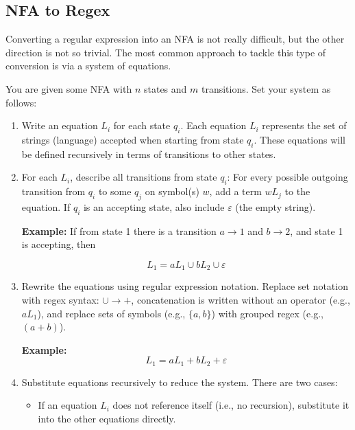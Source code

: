 \subsection{NFA to Regex}

Converting a regular expression into an NFA is not really difficult, but the other direction is not 
so trivial. The most common approach to tackle this type of conversion is via a system of equations.

You are given some NFA with \(n\) states and \(m\) transitions. Set your system as follows:

\begin{enumerate}

    \item Write an equation \(L_i\) for each state \(q_i\). 
    Each equation \(L_i\) represents the set of strings (language) accepted when starting from state 
    \(q_i\). These equations will be defined recursively in terms of transitions to other states.

    \item For each \(L_i\), describe all transitions from state \(q_i\):  
    For every possible outgoing transition from \(q_i\) to some \(q_j\) on symbol(s) \(w\), add a term 
    \(w L_j\) to the equation. If \(q_i\) is an accepting state, also include \(\varepsilon\) (the empty 
    string).

    \textbf{Example:} If from state 1 there is a transition \(a \to 1\) and \(b \to 2\), and state 1 is 
    accepting, then  
    
    \[
        L_1 = a L_1 \cup b L_2 \cup \varepsilon
    \]

    \item Rewrite the equations using regular expression notation. 
    Replace set notation with regex syntax: \(\cup \to +\), concatenation is written without an operator 
    (e.g., \(a L_1\)), and replace sets of symbols (e.g., \(\{a, b\}\)) with grouped regex (e.g., \((a + b)\)).

    \textbf{Example:}  
    \[
        L_1 = a L_1 + b L_2 + \varepsilon
    \]

    \item Substitute equations recursively to reduce the system. There are two cases:  
    
    \begin{itemize}
        
        \item If an equation \(L_i\) does not reference itself (i.e., no recursion), substitute 
        it into the other equations directly.
        

\end{itemize}
\end{enumerate}
